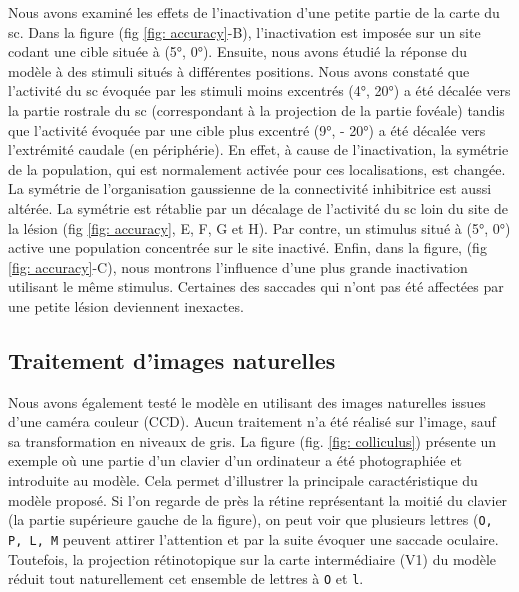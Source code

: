 Nous avons examiné les effets de l'inactivation d'une petite partie de la carte du \gls{sc}. Dans la figure (fig \ref{fig: accuracy}-B), l'inactivation est imposée sur un site codant une cible située à (5°, 0°). Ensuite, nous avons étudié la réponse du modèle à des stimuli situés à différentes positions. Nous avons constaté que l'activité du \gls{sc} évoquée par les stimuli moins excentrés (4°, 20°) a été décalée vers la partie rostrale du \gls{sc} (correspondant à la projection de la partie fovéale) tandis que l'activité évoquée par une cible plus excentré (9°, - 20°) a été décalée vers l'extrémité caudale (en périphérie). En effet, à cause de l'inactivation, la symétrie de la population, qui est normalement activée pour ces localisations, est changée. La symétrie de l'organisation gaussienne de la connectivité inhibitrice est aussi altérée. La symétrie est rétablie par un décalage de l'activité du \gls{sc} loin du site de la lésion (fig \ref{fig: accuracy}, E, F, G et H). Par contre, un stimulus situé à (5°, 0°) active une population concentrée sur le site inactivé. Enfin, dans la figure, (fig \ref{fig: accuracy}-C), nous montrons l'influence d'une plus grande inactivation utilisant le même stimulus. Certaines des saccades qui n'ont pas été affectées par une petite lésion deviennent inexactes. 

\subsection{Traitement d'images naturelles}

Nous avons également testé le modèle en utilisant des images naturelles issues d'une caméra couleur (CCD). Aucun traitement n'a été réalisé sur l'image, sauf sa transformation en niveaux de gris. La figure (fig. \ref {fig: colliculus}) présente un exemple où une partie d'un clavier d'un ordinateur a été photographiée et introduite au modèle. Cela permet d'illustrer la principale caractéristique du modèle proposé. Si l'on regarde de près la rétine représentant la moitié du clavier (la partie supérieure gauche de la figure), on peut voir que plusieurs lettres ({\tt O, P, L, M} peuvent attirer l'attention et par la suite évoquer une saccade oculaire. Toutefois, la projection rétinotopique sur la carte intermédiaire (V1) du modèle réduit tout naturellement cet ensemble de lettres à {\tt O} et {\tt l}.\\

